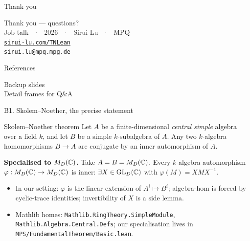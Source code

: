 \documentclass[aspectratio=169,10pt]{beamer}
\begin{document}
\begin{frame}{Thank you}
    \begin{center}
    \vspace{2.2em}
    {\Huge\textcolor{leangreen}{Thank you --- questions?}}\\[2.0em]
    {\large Job talk\ \ $\cdot$\ \ 2026\ \ $\cdot$\ \ Sirui Lu\ \ $\cdot$\ \ MPQ}\\[0.8em]
    {\normalsize\texttt{\href{https://sirui-lu.com/TNLean}{sirui-lu.com/TNLean}}}\\[2.0em]
    \texttt{sirui.lu@mpq.mpg.de}
    \end{center}
\end{frame}

\begin{frame}[allowframebreaks]{References}
    \scriptsize
    
\end{frame}

\appendix

\begin{frame}
    \begin{center}
    \vspace{2.0em}
    {\Huge\textcolor{leangreen}{Backup slides}}\\[1.2em]
    {\large Detail frames for Q\&A}
    \end{center}
\end{frame}

\begin{frame}{B1. Skolem--Noether, the precise statement}
    \begin{block}{Skolem--Noether theorem}
        Let $A$ be a finite-dimensional \emph{central simple} algebra over a field $k$, and let $B$ be a simple $k$-subalgebra of $A$. Any two $k$-algebra homomorphisms $B \to A$ are conjugate by an inner automorphism of $A$.
    \end{block}
    \vspace{0.4em}
    \textbf{Specialised to $M_D(\mathbb{C})$.} Take $A = B = M_D(\mathbb{C})$. Every $k$-algebra automorphism $\varphi : M_D(\mathbb{C}) \to M_D(\mathbb{C})$ is inner: $\exists X \in \mathrm{GL}_D(\mathbb{C})$ with $\varphi(M) = X M X^{-1}$.
    \vspace{0.4em}
    \begin{itemize}
        \item In our setting: $\varphi$ is the linear extension of $A^i \mapsto B^i$; algebra-hom is forced by cyclic-trace identities; invertibility of $X$ is a side lemma.
        \item Mathlib homes: \texttt{Mathlib.RingTheory.SimpleModule}, \texttt{Mathlib.Algebra.Central.Defs}; our specialisation lives in \texttt{MPS/FundamentalTheorem/Basic.lean}.
    \end{itemize}
\end{frame}
\end{document}
